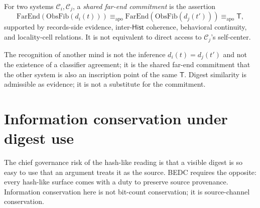 \begin{definition}
\label{def:hash-like-shared-far-end-commitment}
For two systems $\mathcal{C}_i, \mathcal{C}_j$, a \emph{shared far-end commitment} is the assertion
$$
\mathrm{FarEnd}(\mathrm{ObsFib}(d_i(t))) \equiv_{\mathrm{apo}} \mathrm{FarEnd}(\mathrm{ObsFib}(d_j(t'))) \equiv_{\mathrm{apo}} \mathsf{T},
$$
supported by records-side evidence, inter-$\mathsf{Hist}$ coherence, behavioral continuity, and locality-cell relations. It is not equivalent to direct access to $\mathcal{C}_j$'s self-center.
\end{definition}

\begin{principle}
\label{prin:hash-like-other-minds-not-collision}
The recognition of another mind is not the inference $d_i(t) = d_j(t')$ and not the existence of a classifier agreement; it is the shared far-end commitment that the other system is also an inscription point of the same $\mathsf{T}$. Digest similarity is admissible as evidence; it is not a substitute for the commitment.
\end{principle}

\section{Information conservation under digest use}
\label{sec:hash-like-information-conservation}

The chief governance risk of the hash-like reading is that a visible digest is so easy to use that an argument treats it as the source. BEDC requires the opposite: every hash-like surface comes with a duty to preserve source provenance. Information conservation here is not bit-count conservation; it is source-channel conservation.

